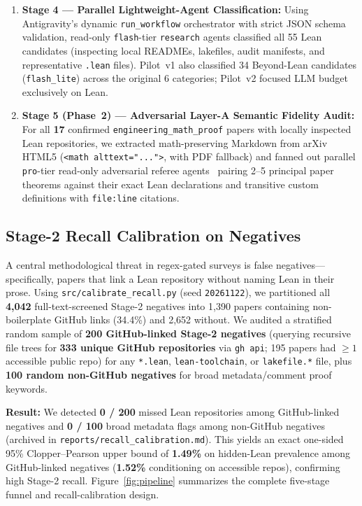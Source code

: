 \documentclass[11pt,letterpaper]{article}
\begin{document}
\begin{enumerate}
  \item \textbf{Stage 4 --- Parallel Lightweight-Agent Classification:} Using Antigravity's dynamic \texttt{run\_workflow} orchestrator with strict JSON schema validation, read-only \texttt{flash}-tier \texttt{research} agents classified all 55 Lean candidates (inspecting local READMEs, lakefiles, audit manifests, and representative \texttt{.lean} files). Pilot~v1 also classified 34 Beyond-Lean candidates (\texttt{flash\_lite}) across the original 6 categories; Pilot~v2 focused LLM budget exclusively on Lean.
  \item \textbf{Stage 5 (Phase~2) --- Adversarial Layer-A Semantic Fidelity Audit:} For all \textbf{17} confirmed \texttt{engineering\_math\_proof} papers with locally inspected Lean repositories, we extracted math-preserving Markdown from arXiv HTML5 (\texttt{<math alttext="...">}, with PDF fallback) and fanned out parallel \texttt{pro}-tier read-only adversarial referee agents~\cite{proofbridge2025} pairing 2--5 principal paper theorems against their exact Lean declarations and transitive custom definitions with \texttt{file:line} citations.
\end{enumerate}

\subsection{Stage-2 Recall Calibration on Negatives}
\label{sec:recall}
A central methodological threat in regex-gated surveys is false negatives---specifically, papers that link a Lean repository without naming Lean in their prose. Using \texttt{src/calibrate\_recall.py} (seed \texttt{20261122}), we partitioned all \textbf{4,042} full-text-screened Stage-2 negatives into 1,390 papers containing non-boilerplate GitHub links (34.4\%) and 2,652 without. We audited a stratified random sample of \textbf{200 GitHub-linked Stage-2 negatives} (querying recursive file trees for \textbf{333 unique GitHub repositories} via \texttt{gh api}; 195 papers had $\ge 1$ accessible public repo) for any \texttt{*.lean}, \texttt{lean-toolchain}, or \texttt{lakefile.*} file, plus \textbf{100 random non-GitHub negatives} for broad metadata/comment proof keywords.

\textbf{Result:} We detected \textbf{0 / 200} missed Lean repositories among GitHub-linked negatives and \textbf{0 / 100} broad metadata flags among non-GitHub negatives (archived in \texttt{reports/recall\_calibration.md}). This yields an exact one-sided 95\% Clopper--Pearson upper bound of \textbf{1.49\%} on hidden-Lean prevalence among GitHub-linked negatives (\textbf{1.52\%} conditioning on accessible repos), confirming high Stage-2 recall. Figure~\ref{fig:pipeline} summarizes the complete five-stage funnel and recall-calibration design.
\end{document}
